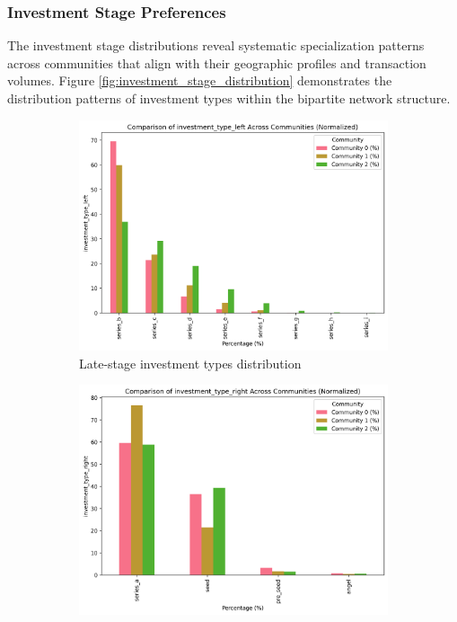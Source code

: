 
\subsubsection{Investment Stage Preferences}

The investment stage distributions reveal systematic specialization patterns across communities that align with their geographic profiles and transaction volumes. Figure \ref{fig:investment_stage_distribution} demonstrates the distribution patterns of investment types within the bipartite network structure.

\begin{figure}[htbp]
\centering
\begin{subfigure}[t]{0.48\textwidth}
    \centering
    \includegraphics[width=\textwidth]{../figures/us/categorical_comparison_investment_type_left.png}
    \caption{Late-stage investment types distribution}
    \label{fig:late_stage_types}
\end{subfigure}
\hfill
\begin{subfigure}[t]{0.48\textwidth}
    \centering
    \includegraphics[width=\textwidth]{../figures/us/categorical_comparison_investment_type_right.png}

\end{subfigure}
\end{figure}
